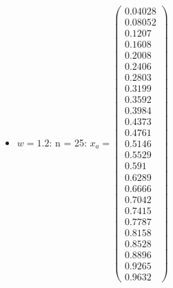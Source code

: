 \documentclass{udpreport}
\begin{document}
\begin{enumerate}
\begin{enumerate}
\begin{itemize}
\begin{itemize}
				\item $w = 1.2$:
				n = 25: $x_{a} = \left(\begin{array}{c} 0.04028\\ 0.08052\\ 0.1207\\ 0.1608\\ 0.2008\\ 0.2406\\ 0.2803\\ 0.3199\\ 0.3592\\ 0.3984\\ 0.4373\\ 0.4761\\ 0.5146\\ 0.5529\\ 0.591\\ 0.6289\\ 0.6666\\ 0.7042\\ 0.7415\\ 0.7787\\ 0.8158\\ 0.8528\\ 0.8896\\ 0.9265\\ 0.9632 \end{array}\right)$

\end{itemize}
\end{itemize}
\end{enumerate}
\end{enumerate}
\end{document}
